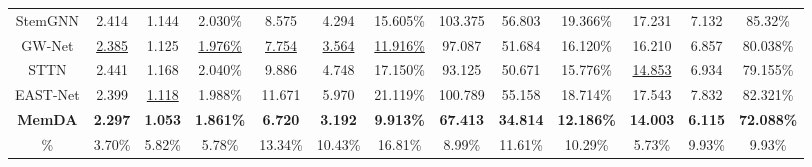 \documentclass[sigconf]{acmart}
\begin{document}
\begin{table*}[h]
{\begin{tabular*}{15.2cm}{@{\extracolsep{\fill}}c||ccc|ccc|ccc|ccc}
        StemGNN & 2.414 & 1.144 & 2.030\% & 8.575 & 4.294 & 15.605\% & 103.375 & 56.803 & 19.366\% & 17.231 & 7.132 & 85.32\% \\
        GW-Net & \underline{2.385} & 1.125 & \underline{1.976\%} & \underline{7.754} & \underline{3.564} & \underline{11.916\%} & 97.087 & 51.684 & 16.120\% & 16.210 & 6.857 & 80.038\% \\
        STTN & 2.441 & 1.168 & 2.040\% & 9.886 & 4.748 & 17.150\% & 93.125 & 50.671 & 15.776\% & \underline{14.853} & 6.934 & 79.155\% \\
        EAST-Net & 2.399 & \underline{1.118} & 1.988\% & 11.671 & 5.970 & 21.119\% & 100.789 & 55.158 & 18.714\% & 17.543 & 7.832 & 82.321\% \\
        \hline
        \textbf{MemDA} & \textbf{2.297} & \textbf{1.053} & \textbf{1.861\%} & \textbf{6.720} & \textbf{3.192} & \textbf{9.913\%} & \textbf{67.413} & \textbf{34.814} & \textbf{12.186\%} & \textbf{14.003} & \textbf{6.115} & \textbf{72.088\%} \\
        \% & 3.70\% & 5.82\% & 5.78\% & 13.34\% & 10.43\% & 16.81\% & 8.99\% & 11.61\% & 10.29\% & 5.73\% & 9.93\% & 9.93\% \\
		\hline
	\end{tabular*}}
\end{table*}
\end{document}
